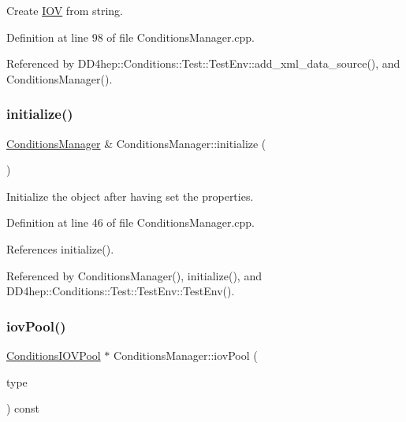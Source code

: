 Create \hyperlink{class_d_d4hep_1_1_i_o_v}{I\+OV} from string. 



Definition at line 98 of file Conditions\+Manager.\+cpp.



Referenced by D\+D4hep\+::\+Conditions\+::\+Test\+::\+Test\+Env\+::add\+\_\+xml\+\_\+data\+\_\+source(), and Conditions\+Manager().

\hypertarget{class_d_d4hep_1_1_conditions_1_1_conditions_manager_a5908a4b7d16963e26e7bc453eae9bd40}{}\label{class_d_d4hep_1_1_conditions_1_1_conditions_manager_a5908a4b7d16963e26e7bc453eae9bd40} 
\subsubsection{\texorpdfstring{initialize()}{initialize()}}
{\footnotesize\ttfamily \hyperlink{class_d_d4hep_1_1_conditions_1_1_conditions_manager}{Conditions\+Manager} \& Conditions\+Manager\+::initialize (\begin{DoxyParamCaption}{ }\end{DoxyParamCaption})}



Initialize the object after having set the properties. 



Definition at line 46 of file Conditions\+Manager.\+cpp.



References initialize().



Referenced by Conditions\+Manager(), initialize(), and D\+D4hep\+::\+Conditions\+::\+Test\+::\+Test\+Env\+::\+Test\+Env().

\hypertarget{class_d_d4hep_1_1_conditions_1_1_conditions_manager_af96241d8f950b534f1b08f9822787d92}{}\label{class_d_d4hep_1_1_conditions_1_1_conditions_manager_af96241d8f950b534f1b08f9822787d92} 
\subsubsection{\texorpdfstring{iov\+Pool()}{iovPool()}}
{\footnotesize\ttfamily \hyperlink{class_d_d4hep_1_1_conditions_1_1_conditions_i_o_v_pool}{Conditions\+I\+O\+V\+Pool} $\ast$ Conditions\+Manager\+::iov\+Pool (\begin{DoxyParamCaption}\item[{const \hyperlink{class_d_d4hep_1_1_i_o_v_type}{I\+O\+V\+Type} \&}]{type }\end{DoxyParamCaption}) const}



